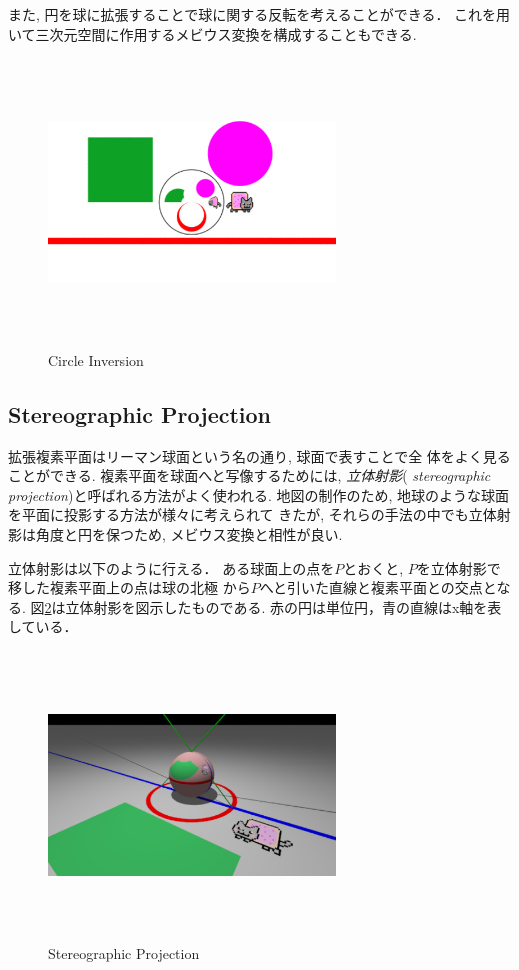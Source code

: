 また, 円を球に拡張することで球に関する反転を考えることができる．
これを用いて三次元空間に作用するメビウス変換を構成することもできる.

\begin{figure}[htbp]
 \begin{center}
      \includegraphics[width=3in, height=3in, keepaspectratio]{../img/klein/circleInversion.pdf}
    \caption{Circle Inversion}
    \label{fig:circleInversion}
 \end{center}
\end{figure}

\subsection{Stereographic Projection}

拡張複素平面はリーマン球面という名の通り, 球面で表すことで全
体をよく見ることができる.
複素平面を球面へと写像するためには, \emph{立体射影}({\it
stereographic projection})と呼ばれる方法がよく使われる.
地図の制作のため, 地球のような球面を平面に投影する方法が様々に考えられて
きたが, それらの手法の中でも立体射影は角度と円を保つため, メビウス変換と相性が良い.

立体射影は以下のように行える．
ある球面上の点を$P$とおくと, $P$を立体射影で移した複素平面上の点は球の北極
から$P$へと引いた直線と複素平面との交点となる.
図\ref{fig:stereoProject}は立体射影を図示したものである.
赤の円は単位円，青の直線はx軸を表している．

\begin{figure}[htbp]
 \center
 \includegraphics[width=3in, height=3in, keepaspectratio]{../img/klein/stereoProject.pdf}
 \caption{Stereographic Projection}
 \label{fig:stereoProject}
\end{figure}


